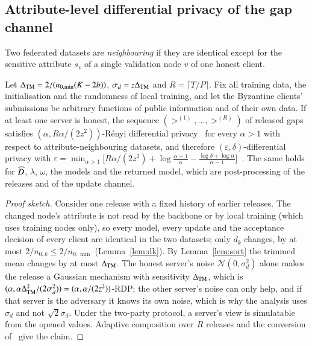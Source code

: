 \subsection{Attribute-level differential privacy of the gap channel}

\begin{definition}
Two federated datasets are \emph{neighbouring} if they are identical except for the sensitive attribute $s_v$ of a single validation node $v$ of one honest client.
\end{definition}

\begin{theorem}\label{thm:dp}
Let $\Delta_{\mathrm{TM}}=2/(n_{0,\min}(K-2b))$, $\sigma_d=z\Delta_{\mathrm{TM}}$ and $R=\lceil T/P\rceil$. Fix all training data, the initialisation and the randomness of local training, and let the Byzantine clients' submissions be arbitrary functions of public information and of their own data. If at least one server is honest, the sequence $(\gt^{(1)},\dots,\gt^{(R)})$ of released gaps satisfies $(\alpha,R\alpha/(2z^2))$-R\'enyi differential privacy~\citep{mironov2017renyi} for every $\alpha>1$ with respect to attribute-neighbouring datasets, and therefore $(\varepsilon,\delta)$-differential privacy with $\varepsilon=\min_{\alpha>1}\bigl[R\alpha/(2z^2)+\log\frac{\alpha-1}{\alpha}-\frac{\log\delta+\log\alpha}{\alpha-1}\bigr]$~\citep{canonne2020discrete}. The same holds for $\widehat{D}$, $\lambda$, $\omega$, the models and the returned model, which are post-processing of the releases and of the update channel.
\end{theorem}

\begin{proof}[Proof sketch]
Consider one release with a fixed history of earlier releases. The changed node's attribute is not read by the backbone or by local training (which uses training nodes only), so every model, every update and the acceptance decision of every client are identical in the two datasets; only $d_k$ changes, by at most $2/n_{0,k}\le2/n_{0,\min}$ (Lemma~\ref{lem:dk}). By Lemma~\ref{lem:sort} the trimmed mean changes by at most $\Delta_{\mathrm{TM}}$. The honest server's noise $\mathcal{N}(0,\sigma_d^2)$ alone makes the release a Gaussian mechanism with sensitivity $\Delta_{\mathrm{TM}}$, which is $(\alpha,\alpha\Delta_{\mathrm{TM}}^2/(2\sigma_d^2))=(\alpha,\alpha/(2z^2))$-RDP; the other server's noise can only help, and if that server is the adversary it knows its own noise, which is why the analysis uses $\sigma_d$ and not $\sqrt2\sigma_d$. Under the two-party protocol, a server's view is simulatable from the opened values. Adaptive composition over $R$ releases and the conversion of~\citep{canonne2020discrete} give the claim.
\end{proof}


